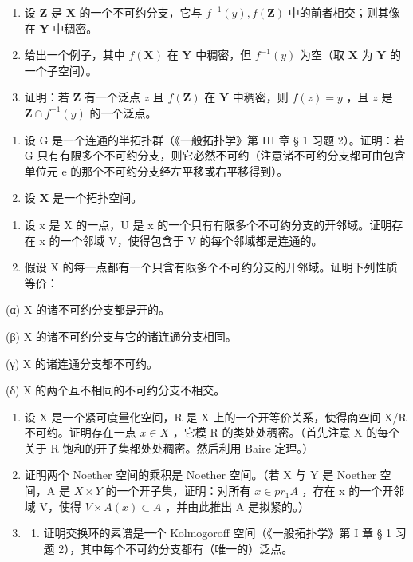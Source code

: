 \begin{enumerate}
\def\labelenumi{(\alph{enumi})}
\item
  设 \(\mathbf{Z}\) 是 \(\mathbf{X}\) 的一个不可约分支，它与 \(f^{-1}(y), f(\mathbf{Z})\) 中的前者相交；则其像在 \(\mathbf{Y}\) 中稠密。
\item
  给出一个例子，其中 \(f(\mathbf{X})\) 在 \(\mathbf{Y}\) 中稠密，但 \(f^{-1}(y)\) 为空（取 \(\mathbf{X}\) 为 \(\mathbf{Y}\) 的一个子空间）。
\item
  证明：若 \(\mathbf{Z}\) 有一个泛点 \(z\) 且 \(f(\mathbf{Z})\) 在 \(\mathbf{Y}\) 中稠密，则 \(f(z) = y\) ，且 \(z\) 是 \(\mathbf{Z} \cap f^{-1}(y)\) 的一个泛点。
\end{enumerate}

\begin{enumerate}
\def\labelenumi{\arabic{enumi}.}
\setcounter{enumi}{4}
\item
  设 G 是一个连通的半拓扑群（《一般拓扑学》第 III 章 § 1 习题 2）。证明：若 G 只有有限多个不可约分支，则它必然不可约（注意诸不可约分支都可由包含单位元 e 的那个不可约分支经左平移或右平移得到）。
\item
  设 \(\mathbf{X}\) 是一个拓扑空间。
\end{enumerate}

\begin{enumerate}
\def\labelenumi{(\alph{enumi})}
\item
  设 x 是 X 的一点，U 是 x 的一个只有有限多个不可约分支的开邻域。证明存在 x 的一个邻域 V，使得包含于 V 的每个邻域都是连通的。
\item
  假设 X 的每一点都有一个只含有限多个不可约分支的开邻域。证明下列性质等价：
\end{enumerate}

(α) X 的诸不可约分支都是开的。

(β) X 的诸不可约分支与它的诸连通分支相同。

(γ) X 的诸连通分支都不可约。

(δ) X 的两个互不相同的不可约分支不相交。

\begin{enumerate}
\def\labelenumi{\arabic{enumi}.}
\setcounter{enumi}{6}
\item
  设 X 是一个紧可度量化空间，R 是 X 上的一个开等价关系，使得商空间 X/R 不可约。证明存在一点 \(x \in X\) ，它模 R 的类处处稠密。（首先注意 X 的每个关于 R 饱和的开子集都处处稠密。然后利用 Baire 定理。）
\item
  证明两个 Noether 空间的乘积是 Noether 空间。（若 X 与 Y 是 Noether 空间，A 是 \(X \times Y\) 的一个开子集，证明：对所有 \(x \in pr_{1}A\) ，存在 x 的一个开邻域 V，使得 \(V \times A(x) \subset A\) ，并由此推出 A 是拟紧的。）
\item
  \begin{enumerate}
  \def\labelenumii{(\alph{enumii})}
  \tightlist
  \item
    证明交换环的素谱是一个 Kolmogoroff 空间（《一般拓扑学》第 I 章 § 1 习题 2），其中每个不可约分支都有（唯一的）泛点。
  \end{enumerate}
\end{enumerate}

